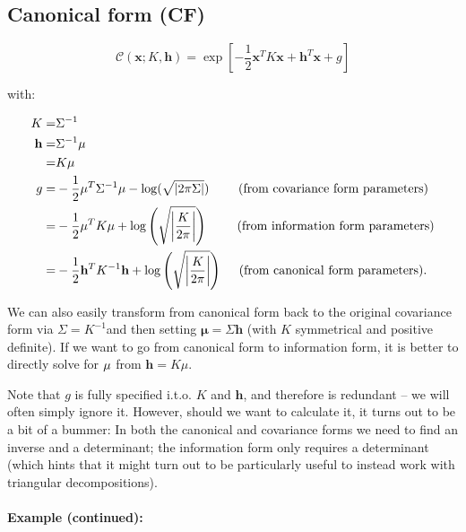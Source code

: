 \subsection{Canonical form (CF)}

\begin{equation}
\mathcal{C}(\mathbf{x};K,\mathbf{h})=\exp\left[-\frac{1}{2}\mathbf{x}^{T}K\mathbf{x}+\mathbf{h}^{T}\mathbf{x}+g\right]
\end{equation}


with:

\begin{align*}
K= & \Sigma^{-1}\\
\mathbf{h=} & \Sigma^{-1}\mathbf{\mu}\\
= & K\mathbf{\mu}\\
g= & -\frac{1}{2}\mathbf{\mu}^{T}\Sigma^{-1}\mathbf{\mu}-\log(\sqrt{|2\pi\Sigma|})\text{ \hspace{1em}\hspace{1em}(from covariance form parameters)}\\
= & -\frac{1}{2}\mathbf{\mu}^{T}K\mathbf{\mu}+\log\left(\sqrt{\left|\frac{K}{2\pi}\right|}\right)\text{ \hspace{1em}\hspace{1em}(from information form parameters)}\\
= & -\frac{1}{2}\mathbf{h}^{T}K^{-1}\mathbf{h}+\log\left(\sqrt{\left|\frac{K}{2\pi}\right|}\right)\text{ \hspace{1em}(from canonical form parameters)}.
\end{align*}


We can also easily transform from canonical form back to the original
covariance form via $\Sigma=K^{-1}$and then setting $\mathbf{\mu}=\Sigma\mathbf{h}$
(with $K$ symmetrical and positive definite). If we want to go from
canonical form to information form, it is better to directly solve
for ${\mathbf\mu}$ from $\mathbf{\mathbf{h}}=K\mu$.

Note that $g$ is fully specified i.t.o. $K$ and $\mathbf{h}$, and
therefore is redundant -- we will often simply ignore it. However,
should we want to calculate it, it turns out to be a bit of a bummer:
In both the canonical and covariance forms we need to find an inverse
and a determinant; the information form only requires a determinant
(which hints that it might turn out to be particularly useful to instead
work with triangular decompositions).


\paragraph{Example (continued):}

